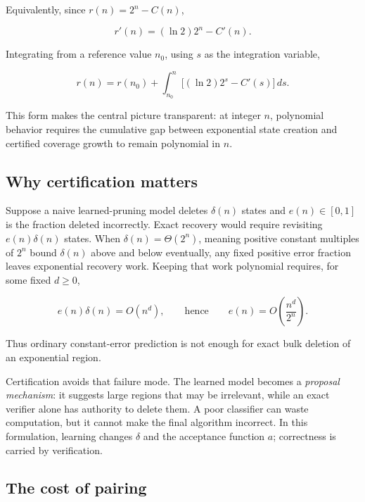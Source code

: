 \documentclass[
  10pt,
  english,
]{article}
\begin{document}
Equivalently, since \(r(n) = 2^n - C(n)\),

\[
r'(n) = (\ln 2)2^n - C'(n).
\]

Integrating from a reference value \(n_0\), using \(s\) as the integration variable,

\begin{tcolorbox}[compactbox]
\begin{equation}
r(n) = r(n_0) + \int_{n_0}^{n} \bigl[(\ln 2)2^s - C'(s)\bigr]\,ds.
\end{equation}
\end{tcolorbox}

This form makes the central picture transparent: at integer \(n\),
polynomial behavior requires the cumulative gap between exponential
state creation and certified coverage growth to remain polynomial in
\(n\).

\hypertarget{why-certification-matters}{%
\subsection{Why certification matters}\label{why-certification-matters}}

Suppose a naive learned-pruning model deletes \(\delta(n)\) states and
\(e(n)\in[0,1]\) is the fraction deleted incorrectly. Exact recovery
would require revisiting \(e(n)\delta(n)\) states. When
\(\delta(n)=\Theta(2^n)\), meaning positive constant multiples of \(2^n\)
bound \(\delta(n)\) above and below eventually, any fixed positive error fraction leaves
exponential recovery work. Keeping that work polynomial requires, for
some fixed \(d\ge0\),

\[
e(n)\delta(n)=O(n^d), \qquad\text{hence}\qquad e(n)=O\!\left(\frac{n^d}{2^n}\right).
\]

Thus ordinary constant-error prediction is not enough for exact bulk
deletion of an exponential region.

Certification avoids that failure mode. The learned model becomes a
\emph{proposal mechanism}: it suggests large regions that may be
irrelevant, while an exact verifier alone has authority to delete them.
A poor classifier can waste computation, but it cannot make the final
algorithm incorrect. In this formulation, learning changes \(\delta\)
and the acceptance function \(a\); correctness is carried by
verification.

\hypertarget{the-cost-of-pairing}{%
\subsection{The cost of pairing}\label{the-cost-of-pairing}}
\end{document}

